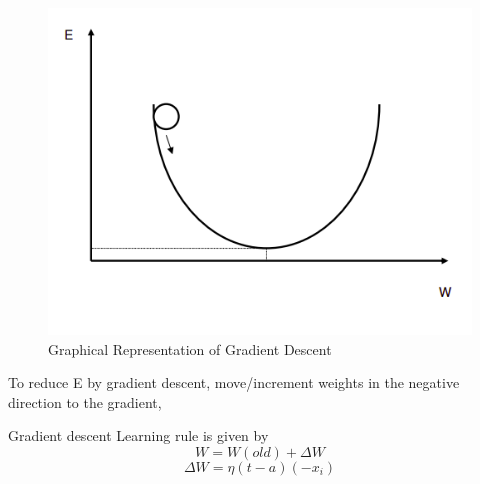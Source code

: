 \documentclass[a4paper,12pt]{report}
\begin{document}
\begin{figure}[htp]
\centering
\includegraphics[scale=.40]{resources/image-03.png}
\caption{Graphical Representation of Gradient Descent}
\label{}
\end{figure}
To reduce E by gradient descent, move/increment weights in the
negative direction to the gradient,


Gradient descent Learning rule is given by
\begin{equation}
W = W(old)+ \Delta W
\end{equation}
\begin{equation}
\Delta W = \eta (t-a)(-x_i)
\end{equation}
\end{document}
